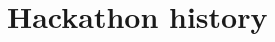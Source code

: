 \documentclass[aspectratio=169,11pt,t]{beamer}
\begin{document}
\section{Hackathon history}


\end{document}
